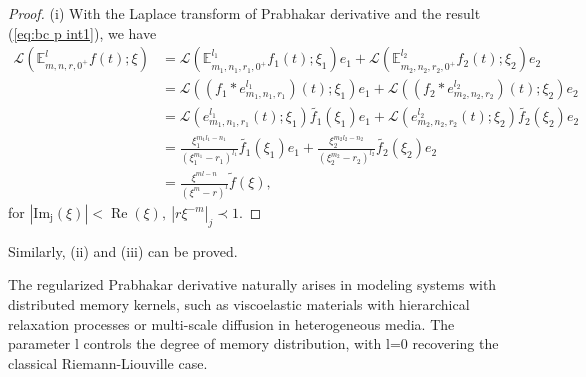 \documentclass[a4paper,12pt]{article}
\theoremstyle{remark}
\begin{document}
\begin{proof}(i)
    With the Laplace transform of  Prabhakar derivative \cite[p.27]{giusti2020practical}
	and the result (\ref{eq:bc p int1}), we have
  \begin{equation}
	\begin{split}
	\mathcal{L}\left( \mathbb{E}_{m,n,r,0^+}^lf(t) ;\xi\right) &= \mathcal{L}\left( \mathbb{E}_{m_1,n_1,r_1,0^+}^{l_1}f_1(t) ;\xi_1\right) e_1+ \mathcal{L}\left(  \mathbb{E}_{m_2,n_2,r_2,0^+}^{l_2}f_2(t) ;\xi_2\right)e_2\\
	&=\mathcal{L}\left(  (f_1*e_{m_1,n_1,r_1}^{l_1})(t) ;\xi_1\right)e_1+\mathcal{L}\left(  (f_2*e_{m_2,n_2,r_2}^{l_2})(t) ;\xi_2\right)e_2\\
	&=\mathcal{L}\left(  e_{m_1,n_1,r_1}^{l_1}(t) ;\xi_1\right)\tilde{f_1}(\xi_1)e_1+\mathcal{L}\left(  e_{m_2,n_2,r_2}^{l_2}(t) ;\xi_2\right)\tilde{f_2}(\xi_2)e_2\\
	&=\frac{\xi_1^{m_1l_1-n_1}}{(\xi_1^{m_1}-r_1)^{l_1}}\tilde{f_1}(\xi_1)e_1+\frac{\xi_2^{m_2l_2-n_2}}{(\xi_2^{m_2}-r_2)^{l_2}}\tilde{f_2}(\xi_2)e_2\\
	&=\frac{\xi^{ml-n}}{(\xi^{m}-r)^{l}}\tilde{f}(\xi),
	\end{split}
	\end{equation}
    for $|\operatorname{Im_j}(\xi)|<\operatorname{Re}(\xi),~|r \xi^{-m}|_j\prec1.$
\end{proof}
  Similarly, (ii) and (iii) can be proved.  

The regularized Prabhakar derivative naturally arises in modeling systems  
with distributed memory kernels, such as viscoelastic materials with hierarchical  
relaxation processes or multi-scale diffusion in heterogeneous media.  
The parameter l controls the degree of memory distribution, with l=0  
recovering the classical Riemann-Liouville case.
\end{document}

